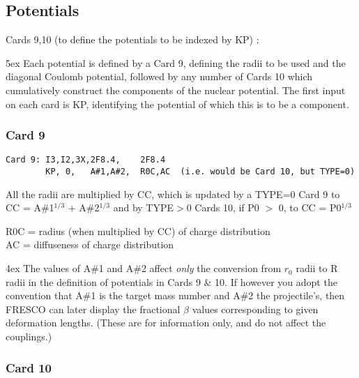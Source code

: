 \documentclass[11pt]{article}
\begin{document}
\subsection{Potentials}
%
\bigskip

 Cards 9,10 (to define the potentials to be indexed by KP) :


\hangindent 5ex
Each potential is defined by a Card 9, defining the radii to be used
and the diagonal Coulomb potential, followed by any number of Cards 10
which cumulatively construct the components of the nuclear potential.
The first input on each card is KP, identifying the potential of which this
is to be a component.

\subsubsection*{Card 9}
\begin{verbatim}
Card 9: I3,I2,3X,2F8.4,    2F8.4
        KP, 0,   A#1,A#2,  R0C,AC  (i.e. would be Card 10, but TYPE=0)
\end{verbatim}
    All the radii are multiplied by CC,
       which is updated by a TYPE=0 Card 9 to CC = A\#1$^{1/3}$ + A\#2$^{1/3}$
       and by TYPE$>$0 Cards 10, if P0 $>$ 0,  to CC = P0$^{1/3}$

R0C = radius (when multiplied by CC) of charge distribution
\\
AC  = diffuseness of charge distribution
\bigskip

\hangindent 4ex
The values of A\#1 and A\#2 affect {\em only} the conversion from $r_0$ radii
to R radii in the definition of potentials in Cards 9 \& 10.
If however you adopt the convention that A\#1 is the target mass number
and A\#2 the projectile's, then FRESCO can later display the
fractional $\beta$ values corresponding to given deformation lengths.
(These are for information only, and do not affect the couplings.)
%
\subsubsection*{Card 10}
\end{document}
